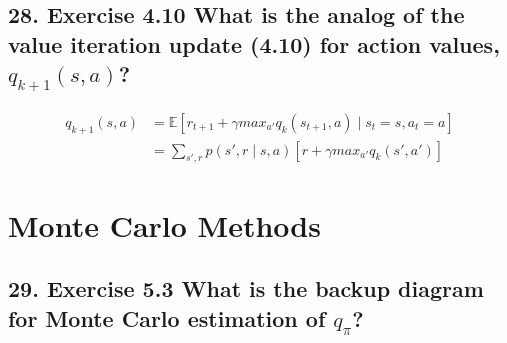 \subsection*{28. Exercise 4.10 What is the analog of the value iteration update (4.10) for action values, $q_{k+1}(s, a)$?}
\begin{align*}
q_{k+1}(s, a) &= \mathbb{E}[r_{t+1} + \gamma max_{a'} q_k(s_{t+1}, a) \mid s_t = s, a_t = a]\\ 
&= \sum_{s', r} p(s', r \mid s, a)[r + \gamma max_{a'} q_k (s', a')]
\end{align*}
\newpage
\section{Monte Carlo Methods}
\subsection*{29. Exercise 5.3 What is the backup diagram for Monte Carlo estimation of $q_\pi$?}
